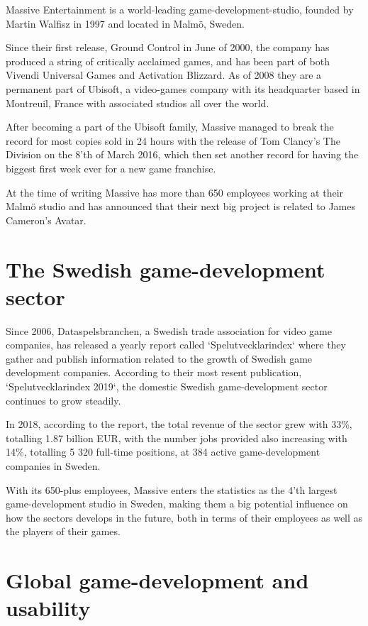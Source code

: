   Massive Entertainment is a world-leading game-development-studio, founded by
  Martin Walfisz in 1997 and located in Malmö, Sweden.

  Since their first release, Ground Control in June of 2000,
  the company has produced a string of critically acclaimed games,
  and has been part of both Vivendi Universal Games and Activation Blizzard. As
  of 2008 they are a permanent part of Ubisoft, a video-games company
  with its headquarter based in Montreuil, France with associated studios all
  over the world.

  After becoming a part of the Ubisoft family, Massive managed to break the
  record for most copies sold in 24 hours with the release of Tom Clancy's The
  Division on the 8'th of March 2016, which then set another record for having
  the biggest first week ever for a new game franchise.

  At the time of writing Massive has more than 650 employees working at their
  Malmö studio and has announced that their next big project is related to
  James Cameron's Avatar.

\section{The Swedish game-development sector}

  Since 2006, Dataspelsbranchen, a Swedish trade association for video game
  companies\cite{citeDataspelsbranchen}, has released a yearly report called
  `Spelutvecklarindex` where they gather and publish information related to the
  growth of Swedish game development companies.
  According to their most resent publication,
  `Spelutvecklarindex 2019`\cite{citeIndex2019}, the domestic Swedish
  game-development sector continues to grow steadily.

  In 2018, according to the report, the total revenue of the sector grew with
  33\%, totalling 1.87 billion EUR, with the number jobs provided also increasing
  with 14\%, totalling 5 320\cite[p. 12]{citeIndex2019} full-time positions,
  at 384\cite[p. 38]{citeIndex2019} active game-development companies in Sweden.

  With its 650-plus employees, Massive enters the statistics as the 4'th
  largest game-development studio in Sweden\cite[p. 21]{citeIndex2019},
  making them a big potential influence on how the sectors develops in the
  future, both in terms of their employees as well as the players of their
  games.


\section{Global game-development and usability}

